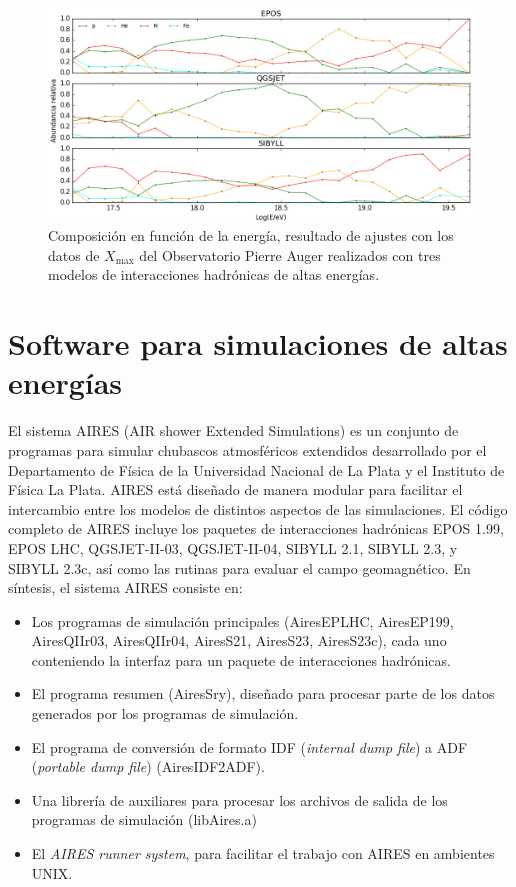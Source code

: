 \begin{center}
\begin{figure}[h]
\centering
\includegraphics[height=0.3\textheight]{Figuras/composition} 
\caption{Composición en función de la energía, resultado de ajustes con los datos de $X_{\text{max}}$ del Observatorio Pierre Auger realizados con tres modelos de interacciones hadrónicas de altas energías.}
\label{fig:composition}
\end{figure}	
\end{center}

\section{Software para simulaciones de altas energías}
El sistema AIRES (AIR shower Extended Simulations) es un conjunto de programas para simular chubascos atmosféricos extendidos desarrollado por el Departamento de Física de la Universidad Nacional de La Plata y el Instituto de Física La Plata. AIRES está diseñado de manera modular para facilitar el intercambio entre los modelos de distintos aspectos de las simulaciones. El código completo de AIRES incluye los paquetes de interacciones hadrónicas EPOS 1.99, EPOS LHC, QGSJET-II-03, QGSJET-II-04, SIBYLL 2.1, SIBYLL 2.3, y SIBYLL 2.3c, así como las rutinas para evaluar el campo geomagnético. En síntesis, el sistema AIRES consiste en:
	\begin{itemize}
	\item Los programas de simulación principales (AiresEPLHC, AiresEP199, AiresQIIr03, AiresQIIr04, AiresS21, AiresS23, AiresS23c), cada uno conteniendo la interfaz para un paquete de interacciones hadrónicas.
	\item El programa resumen (AiresSry), diseñado para procesar parte de los datos generados por los programas de simulación.
	\item El programa de conversión de formato IDF (\textit{internal dump file}) a ADF (\textit{portable dump file}) (AiresIDF2ADF).
	\item Una librería de auxiliares para procesar los archivos de salida de los programas de simulación (libAires.a)
	\item El \textit{AIRES runner system}, para facilitar el trabajo con AIRES en ambientes UNIX. 
	\end{itemize}
	
